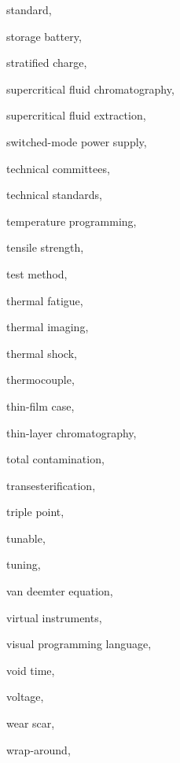 \begin{theindex}
  \item \lowercase {standard}, 
  \item \lowercase {storage battery}, 
  \item \lowercase {stratified charge}, 
  \item \lowercase {supercritical fluid chromatography}, 
  \item \lowercase {supercritical fluid extraction}, 
  \item \lowercase {switched-mode power supply}, 
  \item \lowercase {technical committees}, 
  \item \lowercase {technical standards}, 
  \item \lowercase {temperature programming}, 
  \item \lowercase {tensile strength}, 
  \item \lowercase {test method}, 
  \item \lowercase {thermal fatigue}, 
  \item \lowercase {thermal imaging}, 
  \item \lowercase {thermal shock}, 
  \item \lowercase {thermocouple}, 
  \item \lowercase {thin-film case}, 
  \item \lowercase {thin-layer chromatography}, 
  \item \lowercase {total contamination}, 
  \item \lowercase {transesterification}, 
  \item \lowercase {triple point}, 
  \item \lowercase {tunable}, 
  \item \lowercase {tuning}, 
  \item \lowercase {van Deemter equation}, 
  \item \lowercase {virtual instruments}, 
  \item \lowercase {visual programming language}, 
  \item \lowercase {void time}, 
  \item \lowercase {voltage}, 
  \item \lowercase {wear scar}, 
  \item \lowercase {wrap-around}, 

\end{theindex}
